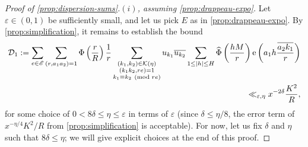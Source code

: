 \documentclass[reqno,11pt]{amsart}
\theoremstyle{definition}
\theoremstyle{remark}
\numberwithin{equation}{section}
\newcommand{\msE}{\mathscr{E}}
\newcommand{\mD}{\mathcal{D}}
\newcommand{\mK}{\mathcal{K}}
\newcommand{\e}{\textnormal{e}}
\newcommand{\eps}{\varepsilon}
\renewcommand{\bar}{\overline}
\renewcommand{\hat}{\widehat}
\renewcommand{\pmod}[1]{\ (\textnormal{mod } #1)}
\begin{document}
\begin{proof}[Proof of \cref{prop:dispersion-sums}.$(i)$, assuming \cref{prop:drappeau-expo}]
Let $\eps \in (0, 1)$ be sufficiently small, and let us pick $E$ as in \cref{prop:drappeau-expo}. By \cref{prop:simplification}, it remains to establish the bound
\[
\begin{aligned}
    \mD_1 := \sum_{e \in \msE} \sum_{(r, a_1a_2) = 1} \Phi\left(\frac{r}{R}\right) \frac{1}{r}
    \sum_{\substack{(k_1, k_2) \in \mK(\eta) \\ (k_1 k_2, re) = 1 \\ k_1 \equiv k_2 \pmod{re}}} u_{k_1} \bar{u_{k_2}} 
    \sum_{1 \le |h| \le H} \hat{\Phi}\left(\frac{hM}{r}\right) \e\left(a_1 h \frac{\bar{a_2k_1}}{r} \right)
    \\
    \ll_{\eps,\eta}
    x^{-2\delta} \frac{K^2}{R},
\end{aligned}
\]
for some choice of $0 < 8\delta \le \eta \le \eps$ in terms of $\eps$ (since $\delta \le \eta/8$, the error term of $x^{-\eta/4} K^2 / R$ from \cref{prop:simplification} is acceptable). For now, let us fix $\delta$ and $\eta$ such that $8\delta \le \eta$; we will give explicit choices at the end of this proof.


\end{proof}
\end{document}
